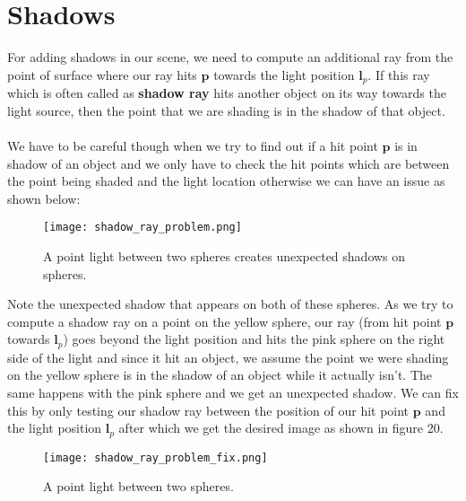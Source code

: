 \documentclass[11pt,a4paper]{article}
\begin{document}
	\section{Shadows}
	
	For adding shadows in our scene, we need to compute an additional ray from the point of surface where our ray hits $\boldsymbol{p}$ towards the light position $\boldsymbol{l}_{p}$. If this ray which is often called as \textbf{shadow ray} hits another object on its way towards the light source, then the point that we are shading is in the shadow of that object. \\~\\We have to be careful though when we try to find out if a hit point $\boldsymbol{p}$ is in shadow of an object and we only have to check the hit points which are between the point being shaded and the light location otherwise we can have an issue as shown below: 
	
	\begin{figure}[H]
		\centering
		\captionsetup{justification=centering}
		\texttt{[image: shadow\_ray\_problem.png]}\quad
		\caption{A point light between two spheres creates unexpected shadows on spheres.}
	\end{figure}
	
	\noindent
	Note the unexpected shadow that appears on both of these spheres. As we try to compute a shadow ray on a point on the yellow sphere, our ray (from hit point $\boldsymbol{p}$ towards $\boldsymbol{l}_{p}$) goes beyond the light position and hits the pink sphere on the right side of the light and since it hit an object, we assume the point we were shading on the yellow sphere is in the shadow of an object while it actually isn't. The same happens with the pink sphere and we get an unexpected shadow. We can fix this by only testing our shadow ray between the position of our hit point $\boldsymbol{p}$ and the light position $\boldsymbol{l}_{p}$ after which we get the desired image as shown in figure 20.
	\\
	\begin{figure}[H]
		\centering
		\captionsetup{justification=centering}
		\texttt{[image: shadow\_ray\_problem\_fix.png]}\quad
		\caption{A point light between two spheres.}
	\end{figure}
	
\end{document}
